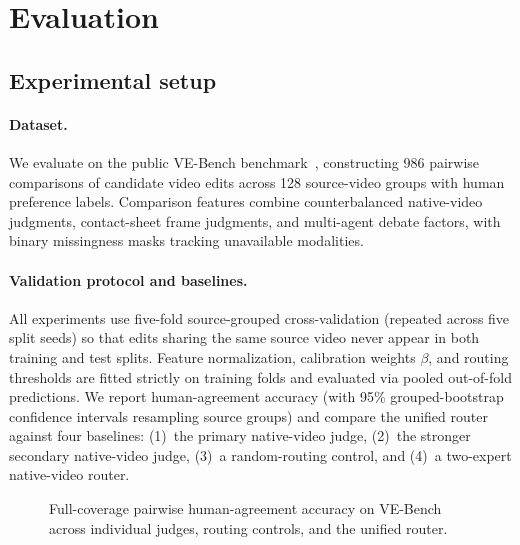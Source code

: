 \section{Evaluation}
\label{sec:evaluation}

\subsection{Experimental setup}
\paragraph{Dataset.}
We evaluate \critical on the public VE-Bench benchmark~\cite{vebench}, constructing 986 pairwise comparisons of candidate video edits across 128 source-video groups with human preference labels. Comparison features combine counterbalanced native-video judgments, contact-sheet frame judgments, and multi-agent debate factors, with binary missingness masks tracking unavailable modalities.

\paragraph{Validation protocol and baselines.}
All experiments use five-fold source-grouped cross-validation (repeated across five split seeds) so that edits sharing the same source video never appear in both training and test splits. Feature normalization, calibration weights $\beta$, and routing thresholds are fitted strictly on training folds and evaluated via pooled out-of-fold predictions. We report human-agreement accuracy (with 95\% grouped-bootstrap confidence intervals resampling source groups) and compare the unified \critical router against four baselines: (1)~the primary native-video judge, (2)~the stronger secondary native-video judge, (3)~a random-routing control, and (4)~a two-expert native-video router.

\begin{figure}[t]
\centering

\caption{Full-coverage pairwise human-agreement accuracy on VE-Bench across individual judges, routing controls, and the unified \critical router.}
\label{fig:fusion-accuracy}
\end{figure}

